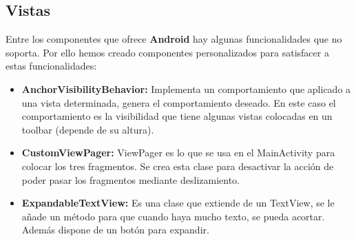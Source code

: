 \subsection{Vistas}
\label{makereference4.3.7}
Entre los componentes que ofrece \textbf{Android} hay algunas funcionalidades que no soporta. Por ello hemos creado componentes personalizados para satisfacer a estas funcionalidades:
\begin{itemize}
    \item \textbf{AnchorVisibilityBehavior:} Implementa un comportamiento que aplicado a una vista determinada, genera el comportamiento deseado. En este caso el comportamiento es la visibilidad que tiene algunas vistas colocadas en un toolbar (depende de su altura). 
    \item \textbf{CustomViewPager:} ViewPager es lo que se usa en el MainActivity para colocar los tres fragmentos. Se crea esta clase para desactivar la acción de poder pasar los fragmentos mediante deslizamiento.
    \item \textbf{ExpandableTextView:} Es una clase que extiende de un TextView, se le añade un método para que cuando haya mucho texto, se pueda acortar. Además dispone de un botón para expandir.
\end{itemize} 

